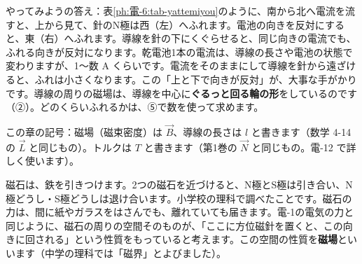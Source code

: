 \noindent やってみようの答え：表\ref{ph:電-6:tab-yattemiyou}のように、南から北へ電流を流すと、上から見て、針のN極は西（左）へふれます。電池の向きを反対にすると、東（右）へふれます。導線を針の下にくぐらせると、同じ向きの電流でも、ふれる向きが反対になります。乾電池1本の電流は、導線の長さや電池の状態で変わりますが、1〜数 A くらいです。電流をそのままにして導線を針から遠ざけると、ふれは小さくなります。この「上と下で向きが反対」が、大事な手がかりです。導線の周りの磁場は、導線を中心に\textbf{ぐるっと回る輪の形}をしているのです（②）。どのくらいふれるかは、⑤で数を使って求めます。

\begin{omoidasou}
\end{omoidasou}

\noindent この章の記号：磁場（磁束密度）は $\vec B$、導線の長さは $l$ と書きます（数学 4-14 の $\vec L$ と同じもの）。トルクは $T$ と書きます（第1巻の $\vec N$ と同じもの。電-12 で詳しく使います）。


\label{ph:電-6:sec1}
磁石は、鉄を引きつけます。2つの磁石を近づけると、N極とS極は引き合い、N極どうし・S極どうしは退け合います。小学校の理科で調べたことです。磁石の力は、間に紙やガラスをはさんでも、離れていても届きます。電-1の電気の力と同じように、磁石の周りの空間そのものが、「ここに方位磁針を置くと、この向きに回される」という性質をもっていると考えます。この空間の性質を\textbf{磁場}といいます（中学の理科では「磁界」とよびました）。

